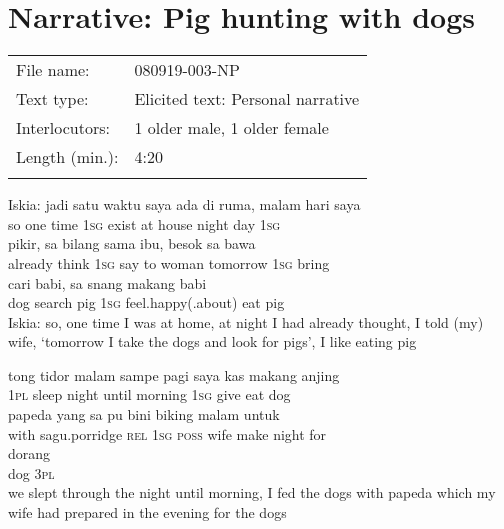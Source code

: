 \section{Narrative: Pig hunting with dogs}
\label{Para_B.6}
\begin{tabular}{ll}
\lsptoprule
File name: &  080919-003-NP\\
Text type: &  Elicited text: Personal narrative\footnotemark{}\\
Interlocutors: &  1 older male, 1 older female\\
Length (min.): &  4:20\\
\lspbottomrule
\end{tabular}
\setcounter{equation}{0}
\ea
\gll   Iskia:    {jadi}    {satu}    {waktu}    {saya}    {ada}   di    {ruma,}    {malam}    {hari}   saya\\
  {}    {so}    {one}    {time}    {\textsc{1sg}}    {exist}   at    {house}    {night}    {day}   \textsc{1sg}\\
    {pikir,}    {sa}    {bilang}    {sama}    {ibu,}    {besok}   sa    {bawa}\\
   {already}    {think}    {\textsc{1sg}}    {say}    {to}    {woman}    {tomorrow}   \textsc{1sg}    {bring}\\
    {cari}    {babi,}    {sa}    {snang}    {makang}    {babi}\\
   {dog}    {search}    {pig}    {\textsc{1sg}}    {feel.happy(.about)}    {eat}    {pig}\\
\glt
Iskia: so, one time I was at home, at night I had already thought, I told (my) wife, ‘tomorrow I take the dogs and look for pigs’, I like eating pig
\z

\ea
\gll   tong    {tidor}   malam    {sampe}    {pagi}    {saya}   kas    {makang}   anjing\\
  \textsc{1pl}    {sleep}   night    {until}    {morning}    {\textsc{1sg}}   give    {eat}   dog\\
    {papeda}   yang    {sa}   pu    {bini}    {biking}   malam    {untuk}\\
   {with}    {sagu.porridge}   \textsc{rel}    {\textsc{1sg}}   \textsc{poss}    {wife}    {make}   night    {for}\\
    {dorang}\\
   {dog}    {\textsc{3pl}}\\
\glt
we slept through the night until morning, I fed the dogs with papeda which my wife had prepared in the evening for the dogs
\z

